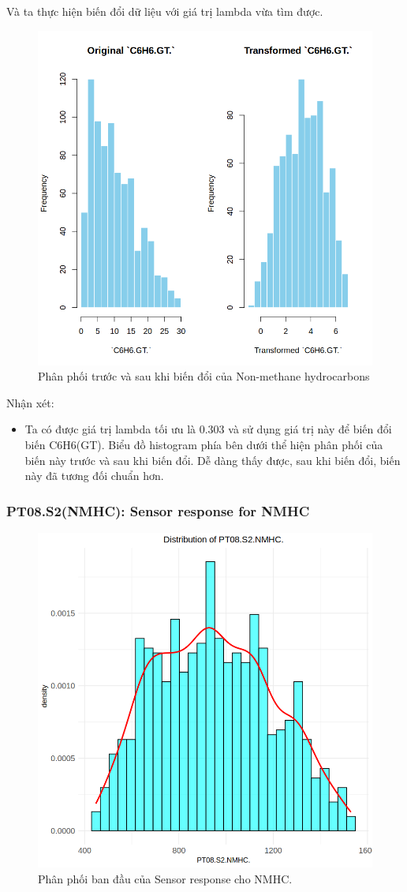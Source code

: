 Và ta thực hiện biến đổi dữ liệu với giá trị lambda vừa tìm được.
\begin{figure}[H]
    \centering
    \includegraphics[width=0.75\columnwidth]{air_figures/C6H6(GT)_transformed_distribution.png}
    \caption{Phân phối trước và sau khi biến đổi của Non-methane hydrocarbons}
    \label{fig:benzene_transformed_distribution}
\end{figure}
Nhận xét:
\begin{itemize}
    \item Ta có được giá trị lambda tối ưu là 0.303 và sử dụng giá trị này để biến đổi biến C6H6(GT). Biểu đồ histogram phía bên dưới thể hiện phân phối của biến này trước và sau khi biến đổi. Dễ dàng thấy được, sau khi biến đổi, biến này đã tương đối chuẩn hơn.
\end{itemize}

\subsubsection{PT08.S2(NMHC): Sensor response for NMHC}

\begin{figure}[H]
    \centering
    \includegraphics[width=0.75\columnwidth]{air_figures/PT08.S2(NMHC)_original_distribution.png}
    \caption{Phân phối ban đầu của Sensor response cho NMHC.}
    \label{fig:srnmhc_original_distribution}
\end{figure}

